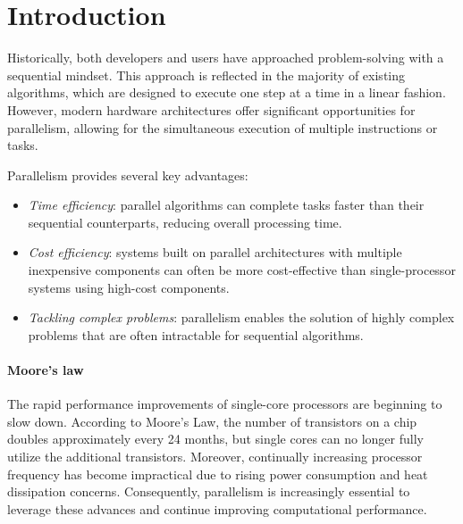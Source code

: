 \section{Introduction}

Historically, both developers and users have approached problem-solving with a sequential mindset. 
This approach is reflected in the majority of existing algorithms, which are designed to execute one step at a time in a linear fashion. 
However, modern hardware architectures offer significant opportunities for parallelism, allowing for the simultaneous execution of multiple instructions or tasks.

Parallelism provides several key advantages:
\begin{itemize}
    \item \textit{Time efficiency}: parallel algorithms can complete tasks faster than their sequential counterparts, reducing overall processing time.
    \item \textit{Cost efficiency}: systems built on parallel architectures with multiple inexpensive components can often be more cost-effective than single-processor systems using high-cost components.
    \item \textit{Tackling complex problems}: parallelism enables the solution of highly complex problems that are often intractable for sequential algorithms.
\end{itemize}

\paragraph*{Moore's law}
The rapid performance improvements of single-core processors are beginning to slow down. 
According to Moore's Law, the number of transistors on a chip doubles approximately every 24 months, but single cores can no longer fully utilize the additional transistors. 
Moreover, continually increasing processor frequency has become impractical due to rising power consumption and heat dissipation concerns. 
Consequently, parallelism is increasingly essential to leverage these advances and continue improving computational performance.